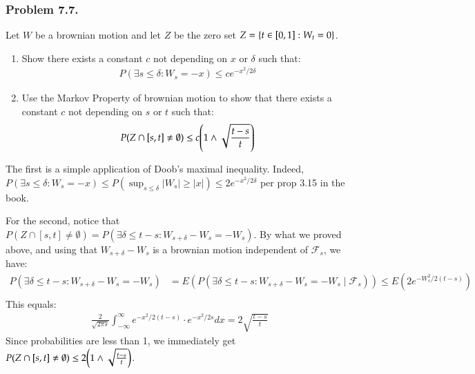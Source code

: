 \documentclass[12pt]{article}
\theoremstyle{definitionstyle}
\newcommand{\SET}[1]{\Set{\mskip-\medmuskip #1 \mskip-\medmuskip}}
\newcommand{\1}{\mathds 1}
\begin{document}
    \subsubsection*{Problem 7.7.}
    Let $W$ be a brownian motion and let $Z$ be the zero set $Z = \SET{t \in [0,1] : W_t = 0}$. 
    \begin{enumerate}
        \item Show there exists a constant $c$ not depending on $x$ or $\delta$ such that:
        \begin{align*}
            P(\exists s \leq \delta : W_s = -x) \leq ce^{-x^2/ 2\delta}
        \end{align*}
        \item Use the Markov Property of brownian motion to show that there exists a constant $c$ not depending on $s$ or $t$ such that:
        \begin{align*}
            P(Z \cap [s,t] \neq \emptyset) \leq c \qty (1 \wedge \sqrt{\frac{t-s}{t}})
        \end{align*}
    \end{enumerate}
    The first is a simple application of Doob's maximal inequality. Indeed, $P(\exists s \leq \delta : W_s = -x) \leq P(\sup_{s \leq \delta} |W_s| \geq |x|) \leq 2e^{-x^2/2\delta}$ per prop 3.15 in the book. 

    For the second, notice that $P(Z \cap [s,t] \neq \emptyset) = P(\exists \delta \leq t-s : W_{s + \delta} - W_s = -W_s)$. By what we proved above, and using that $W_{s + \delta} - W_s$ is a brownian motion independent of $\mathcal F_s$, we have:
    \begin{align*}
        P(\exists \delta \leq t-s : W_{s + \delta} - W_s = -W_s) &= E(P(\exists \delta \leq t-s : W_{s + \delta} - W_s = -W_s \mid \mathcal F_s)) \leq E(2e^{-W_s^2 / 2(t-s)})\\
    \end{align*}
    This equals:
    \begin{align*}
        \frac{2}{\sqrt{2 \pi s}} \int_{-\infty}^{\infty} e^{-x^2 / 2(t-s)} \cdot e^{-x^2 / 2s} dx = 2 \sqrt{\frac{t-s}{t}} 
    \end{align*}
    Since probabilities are less than 1, we immediately get $P(Z \cap [s,t] \neq \emptyset) \leq 2\qty(1 \land \sqrt{\frac{t-s}{t}})$.
\end{document}
